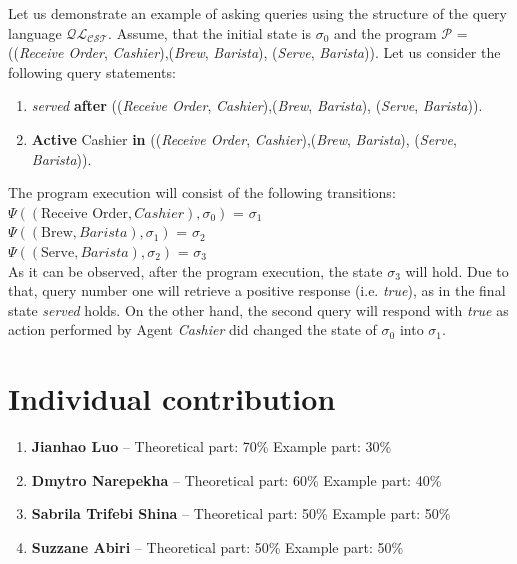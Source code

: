 \documentclass[a4paper]{article}
\begin{document}
Let us demonstrate an example of asking queries using the structure of the query language $\mathcal{QL_{CST}}$. 
Assume, that the initial state is $\sigma_0$ and the program $\mathcal{P}$ = ((\textit{Receive Order}, \textit{Cashier}),(\textit{Brew}, \textit{Barista}), (\textit{Serve}, \textit{Barista})).
Let us consider the following query statements:
\begin{enumerate}
  \item \textit{served} \textbf{after} ((\textit{Receive Order}, \textit{Cashier}),(\textit{Brew}, \textit{Barista}), (\textit{Serve}, \textit{Barista})).
  \item \textbf{Active} Cashier \textbf{in} ((\textit{Receive Order}, \textit{Cashier}),(\textit{Brew}, \textit{Barista}), (\textit{Serve}, \textit{Barista})).
\end{enumerate}
The program execution will consist of the following transitions: \\[0.5\baselineskip]
$\Psi((\text{Receive Order},Cashier),\sigma_0)$ = $\sigma_1$ \\[0.1\baselineskip]
$\Psi((\text{Brew}, Barista),\sigma_1)$ = $\sigma_2$ \\[0.1\baselineskip]
$\Psi((\text{Serve},Barista),\sigma_2)$ = $\sigma_3$ \\[0.7\baselineskip]
As it can be observed, after the program execution, the state $\sigma_3$ will hold. Due to that, query number one will retrieve a positive response (i.e. \textit{true}), 
as in the final state \textit{served} holds. 
On the other hand, the second query will respond with \textit{true} as  action performed by Agent \textit{Cashier} did changed the state of $\sigma_0$ into $\sigma_1$.
\section{Individual contribution}

\begin{enumerate}
    \item \textbf{Jianhao Luo} -- Theoretical part: 70\%  Example part: 30\%
    \item \textbf{Dmytro Narepekha} -- Theoretical part: 60\%  Example part:  40\%
    \item \textbf{Sabrila Trifebi Shina} -- Theoretical part: 50\%  Example part: 50\%
    \item \textbf{Suzzane Abiri} -- Theoretical part: 50\%  Example part: 50\%
\end{enumerate}
\end{document}
